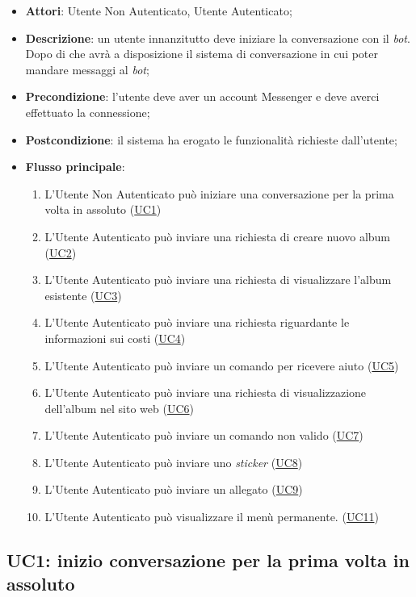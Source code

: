 \begin{itemize}
  \item \textbf{Attori}: Utente Non Autenticato, Utente Autenticato;
  \item \textbf{Descrizione}: un utente innanzitutto deve iniziare la
conversazione con il \textit{bot}. Dopo di che avrà a disposizione il sistema di
conversazione in cui poter mandare messaggi al \textit{bot};
  \item \textbf{Precondizione}: l'utente deve aver un account Messenger e deve
averci effettuato la connessione;
  \item \textbf{Postcondizione}: il sistema ha erogato le funzionalità
richieste dall'utente;
  \item \textbf{Flusso principale}:
  \begin{enumerate}
    \item L'Utente Non Autenticato può iniziare una conversazione per la prima
volta in assoluto (\hyperlink{UC1}{UC1})
    \item L'Utente Autenticato può inviare una richiesta di creare nuovo
album (\hyperlink{UC2}{UC2})
    \item L'Utente Autenticato può inviare una richiesta di visualizzare l'album
esistente (\hyperlink{UC3}{UC3})
    \item L'Utente Autenticato può inviare una richiesta riguardante le
informazioni sui costi (\hyperlink{UC4}{UC4})
    \item L'Utente Autenticato può inviare un comando per ricevere aiuto
(\hyperlink{UC5}{UC5})
    \item L'Utente Autenticato può inviare una richiesta di visualizzazione
dell'album nel sito web (\hyperlink{UC6}{UC6})
    \item L'Utente Autenticato può inviare un comando non valido
(\hyperlink{UC7}{UC7})
    \item L'Utente Autenticato può inviare uno \textit{sticker}
(\hyperlink{UC8}{UC8})
    \item L'Utente Autenticato può inviare un allegato (\hyperlink{UC9}{UC9})
    \item L'Utente Autenticato può visualizzare il menù permanente.
(\hyperlink{UC11}{UC11})
  \end{enumerate}
\end{itemize}



\subsection{UC1: inizio conversazione per la prima volta in assoluto}
\label{uc:uc1}
\hypertarget{UC1}{}

